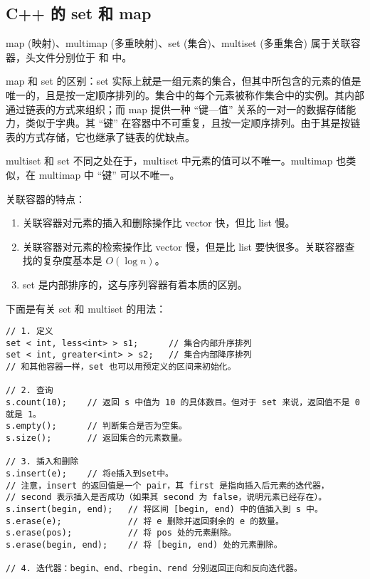 \subsection{C++ 的 set 和 map}
	map (映射)、multimap (多重映射)、set (集合)、multiset (多重集合) 属于关联容器，头文件分别位于  和  中。

	map 和 set 的区别：set 实际上就是一组元素的集合，但其中所包含的元素的值是唯一的，且是按一定顺序排列的。集合中的每个元素被称作集合中的实例。其内部通过链表的方式来组织；而 map 提供一种 “键—值” 关系的一对一的数据存储能力，类似于字典。其 “键” 在容器中不可重复，且按一定顺序排列。由于其是按链表的方式存储，它也继承了链表的优缺点。

	multiset 和 set 不同之处在于，multiset 中元素的值可以不唯一。multimap 也类似，在 multimap 中 “键” 可以不唯一。
	
	关联容器的特点：
	
	\begin{enumerate}
		\item 关联容器对元素的插入和删除操作比 vector 快，但比 list 慢。
		\item 关联容器对元素的检索操作比 vector 慢，但是比 list 要快很多。关联容器查找的复杂度基本是 $O(\log n)$。
		\item set 是内部排序的，这与序列容器有着本质的区别。
	\end{enumerate}
	
	下面是有关 set 和 multiset 的用法：
	
\begin{lstlisting}
// 1. 定义
set < int, less<int> > s1;		// 集合内部升序排列
set < int, greater<int> > s2;	// 集合内部降序排列
// 和其他容器一样，set 也可以用预定义的区间来初始化。

// 2. 查询
s.count(10);	// 返回 s 中值为 10 的具体数目。但对于 set 来说，返回值不是 0 就是 1。
s.empty();		// 判断集合是否为空集。
s.size();		// 返回集合的元素数量。

// 3. 插入和删除
s.insert(e);	// 将e插入到set中。
// 注意，insert 的返回值是一个 pair，其 first 是指向插入后元素的迭代器，
// second 表示插入是否成功（如果其 second 为 false，说明元素已经存在）。
s.insert(begin, end);	// 将区间 [begin, end) 中的值插入到 s 中。
s.erase(e);				// 将 e 删除并返回剩余的 e 的数量。
s.erase(pos);			// 将 pos 处的元素删除。
s.erase(begin, end);	// 将 [begin, end) 处的元素删除。

// 4. 迭代器：begin、end、rbegin、rend 分别返回正向和反向迭代器。
\end{lstlisting}
	

